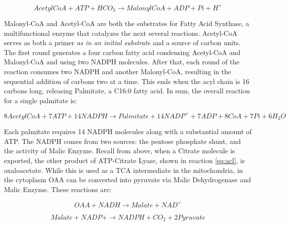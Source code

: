 \documentclass{tufte-handout}
\begin{document}
\begin{equation}\label{eq:acc}
AcetylCoA + ATP + HCO_3 \rightarrow MalonylCoA + ADP + Pi + H^+
\end{equation}

Malonyl-CoA and Acetyl-CoA are both the substrates for Fatty Acid Synthase, a multifunctional enzyme that catalyzes the next several reactions.  Acetyl-CoA serves as both a primer \emph{as in an initial substrate} and a source of carbon units.  The first round generates a four carbon fatty acid condensing Acetyl-CoA and Malonyl-CoA and using two NADPH molecules. After that, each round of the reaction consumes two NADPH and another Malonyl-CoA, resulting in the sequential addition of carbons two at a time.  This ends when the acyl chain is 16 carbons long, releasing Palmitate, a C16:0 fatty acid. In sum, the overall reaction for a single palmitate is:

\begin{equation}\label{eq:pamitate-overall}
8 AcetylCoA + 7 ATP + 14 NADPH \rightarrow Palmitate + 14 NADP^+ + 7 ADP + 8 CoA  + 7 Pi + 6H_2O
\end{equation}

  Each palmitate requires 14 NADPH molecules along with a substantial amount of ATP.  The NADPH comes from two sources: the pentose phosphate shunt, and the activity of Malic Enzyme. Recall from above, when a Citrate molecule is exported, the other product of ATP-Citrate Lyase, shown in reaction \ref{eq:acl}, is oxaloacetate.  While this is used as a TCA intermediate in the mitochondria, in the cytoplasm OAA can be converted into pyruvate via Malic Dehydrogenase and Malic Enzyme.  These reactions are:

\begin{equation}\label{eq:me}
OAA + NADH  \rightarrow Malate + NAD^+
\end{equation}

\begin{equation}\label{eq:mdh}
Malate + NADP+  \rightarrow NADPH + CO_2 + 2 Pyruvate
\end{equation}
\end{document}
